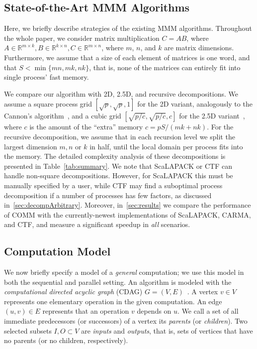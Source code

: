 \documentclass[sigplan,review,anonymous,10pt]{acmart}\settopmatter{printfolios=true,printccs=false,printacmref=false}
\begin{document}
\subsection{State-of-the-Art MMM Algorithms}
\label{sec:state-of-the-artAlgs}

Here, we briefly describe strategies of the existing MMM algorithms.
Throughout the whole paper, we consider matrix multiplication $C = 
AB$, where $A \in \mathbb{R}^{m \times k}, B \in \mathbb{R}^{k \times n},  C 
\in \mathbb{R}^{m \times 
	n}$, where $m$, $n$, and $k$ are matrix dimensions. Furthermore, we assume 
that a size of each element of matrices is one word, and that $S < 
\min\{mn, mk, nk\}$, that is, none of the matrices can entirely 
fit into single process' fast memory. 

We compare our algorithm with 2D, 2.5D, and recursive 
decompositions. We assume a square process grid $[\sqrt{p}, \sqrt{p}, 1]$ 
for the 2D variant, analogously 
to the Cannon's algorithm~\cite{Cannon}, and a cubic grid $[\sqrt{p/c}, 
\sqrt{p/c}, c]$ for the 2.5D 
variant~\cite{25d}, where $c$ is the amount of the ``extra'' memory $c = 
pS/(mk 
+ nk)$. For the recursive decomposition, we assume that in each recursion level 
we split the largest dimension $m,n$ or $k$ in half, until the local domain per 
process fits into the memory.
	The detailed complexity analysis of these decompositions is 
presented in 
Table~\ref{tab:summary}.
We note that ScaLAPACK or CTF can handle non-square 
decompositions. However, for ScaLAPACK this must be manually specified by a 
user, while CTF may find a suboptimal process decomposition if a number of 
processes has few factors, as discussed in~\cref{sec:decompArbitrary}. 
Moreover, 
in~\cref{sec:results} we compare the 
performance of COMM with the currently-newest implementations of ScaLAPACK, 
CARMA,  
and CTF, and measure a significant speedup in \emph{all} scenarios. 

\subsection{Computation Model}
\label{sec:compModel}

We now briefly specify a model of a \emph{general} computation; we use this
model in both the sequential and parallel setting.
An algorithm is modeled with the \emph{computational directed acyclic graph} 
(CDAG)
$G=(V,E)$~\cite{completeRegisterProblems,pebblegameregister,
registerpebblecolor}. A vertex $v \in V$ represents one
elementary operation in the given computation. An edge $(u,v) \in E$
represents that an operation $v$ depends on $u$. We call a set of all
immediate predecessors (or successors) of a vertex its \emph{parents} (or
\emph{children}).  Two selected subsets $I, O \subset V$ are \emph{inputs} and
\emph{outputs}, that is, sets of vertices that have no parents (or no children,
respectively).
\end{document}
